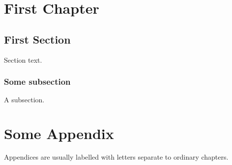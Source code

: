 \chapter{First Chapter}
\section{First Section}

Section text.

\subsection{Some subsection}

A subsection.

\appendix
\chapter{Some Appendix}
Appendices are usually labelled with letters separate to ordinary chapters.

